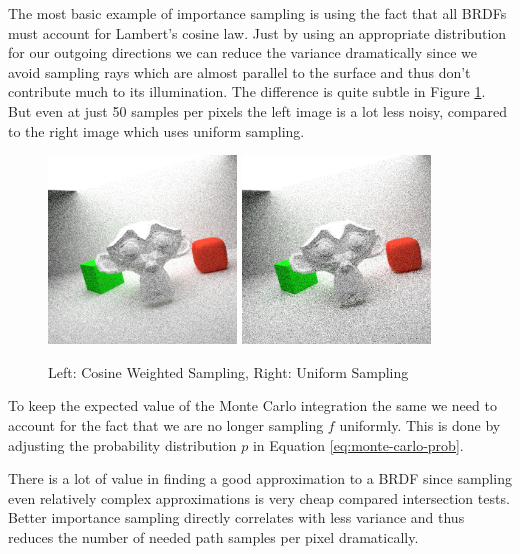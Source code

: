 \documentclass{ACGSeminar}
\begin{document}
The most basic example of importance sampling is using the fact that all BRDFs must account for Lambert's cosine law. Just by using an appropriate distribution for our outgoing directions we can reduce the variance dramatically since we avoid sampling rays which are almost parallel to the surface and thus don't contribute much to its illumination. The difference is quite subtle in Figure \ref{fig:rendering-cos-weighted}. But even at just 50 samples per pixels the left image is a lot less noisy, compared to the right image which uses uniform sampling.

\begin{figure}[htb!]
  \centering
  \includegraphics[width=5cm,natwidth=512,natheight=512]{figures/50_spp_cosine_weighted.png}
  \includegraphics[width=5cm,natwidth=512,natheight=512]{figures/50_spp_uniform.png}
  \caption{Left: Cosine Weighted Sampling, Right: Uniform Sampling}
  \label{fig:rendering-cos-weighted}
\end{figure}

To keep the expected value of the Monte Carlo integration the same we need to account for the fact that we are no longer sampling $f$ uniformly. This is done by adjusting the probability distribution $p$ in Equation \eqref{eq:monte-carlo-prob}.

There is a lot of value in finding a good approximation to a BRDF since sampling even relatively complex approximations is very cheap compared intersection tests. Better importance sampling directly correlates with less variance and thus reduces the number of needed path samples per pixel dramatically.
\end{document}
